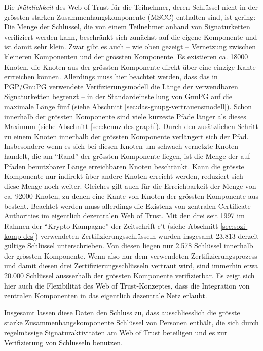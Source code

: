 Die \emph{N\"utzlichkeit} des Web of Trust f\"ur die Teilnehmer, deren
Schl\"ussel nicht in der gr\"ossten starken Zusammenhangskomponente
(MSCC)
enthalten sind, ist gering: Die Menge der Schl\"ussel, die von einem
Teilnehmer anhand von Signaturketten verifiziert werden kann,
beschr\"ankt sich zun\"achst auf die eigene Komponente und ist damit
sehr klein. Zwar gibt es auch -- wie oben gezeigt -- Vernetzung
zwischen kleineren Komponenten und der gr\"ossten Komponente. Es
existieren ca. 18000 Knoten, die Knoten aus der gr\"ossten Komponente
direkt \"uber eine einzige Kante errreichen k\"onnen. Allerdings muss
hier beachtet werden, dass das in PGP/GnuPG verwendete
Verifizierungsmodell die L\"ange der verwendbaren Signaturketten
begrenzt -- in der Standardeinstellung von GnuPG auf die maximale
L\"ange f\"unf (siehe Abschnitt
\ref{sec:das-gnupg-vertrauensmodell}). Schon innerhalb der gr\"ossten
Komponente sind viele k\"urzeste Pfade l\"anger als dieses Maximum
(siehe Abschnitt \ref{sec:kennz-des-graph}). Durch den zus\"atzlichen
Schritt zu einem Knoten innerhalb der gr\"ossten Komponente
verl\"angert sich der Pfad. Insbesondere wenn es sich bei diesen
Knoten um schwach vernetzte Knoten handelt, die am ``Rand'' der
gr\"ossten Komponente liegen, ist die Menge der auf Pfaden benutzbarer
L\"ange erreichbaren Knoten beschr\"ankt. Kann die gr\"osste
Komponente nur indirekt \"uber andere Knoten erreicht werden,
reduziert sich diese Menge noch weiter. Gleiches gilt auch f\"ur die
Erreichbarkeit der Menge von ca. 92000 Knoten, zu denen eine Kante von
Knoten der gr\"ossten Komponente aus besteht. Beachtet werden muss
allerdings die Existenz von zentralen Certificate Authorities im
eigentlich dezentralen Web of Trust. Mit den drei seit 1997 im Rahmen
der ``Krypto-Kampagne'' der Zeitschrift c't (siehe Abschnitt
\ref{sec:sozi-komp-des}) verwendeten Zertifizierungsschl\"usseln
wurden insgesamt 23.813 derzeit g\"ultige Schl\"ussel
unterschrieben. Von diesen liegen nur 2.578 Schl\"ussel innerhalb der
gr\"ossten Komponente. Wenn also nur dem verwendeten
Zertifizierungsprozess und damit diesen drei
Zertifizierungsschl\"usseln vertraut wird, sind immerhin etwa 20.000
Schl\"ussel aussserhalb der gr\"ossten Komponente verifizierbar. Es
zeigt sich hier auch die Flexibilit\"at des Web of Trust-Konzeptes,
dass die Integration von zentralen Komponenten in das eigentlich
dezentrale Netz erlaubt.

Insgesamt lassen diese Daten den Schluss zu, dass ausschliesslich die
gr\"osste starke Zusammenhangskomponente Schl\"ussel von Personen
enth\"alt, die sich durch regelm\"assige Signaturaktivit\"aten am Web
of Trust beteiligen und es zur Verifizierung von Schl\"usseln
benutzen. 

